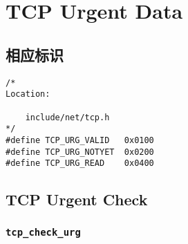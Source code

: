 \section{TCP Urgent Data}
        \subsection{相应标识}
\begin{verbatim}
/*
Location:

    include/net/tcp.h
*/
#define TCP_URG_VALID   0x0100
#define TCP_URG_NOTYET  0x0200
#define TCP_URG_READ    0x0400
\end{verbatim}
        \subsection{TCP Urgent Check}
            \subsubsection{\texttt{tcp_check_urg}}
                \label{TCPUrgent:tcp_check_urg}

